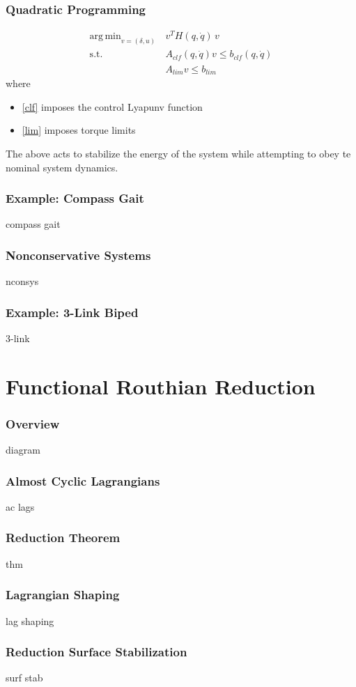 \documentclass{beamer}
\DeclareMathOperator*{\argmin}{arg\,min}
\begin{document}
\begin{frame}
  \frametitle{Quadratic Programming}
  \begin{align}
    \nonumber
    \argmin_{v = (\delta, u)}  \, &v^T \! H(q, \dot q) \, v\\
    \label{clf} \tag{clf}
    \mbox{s.t. } & A_{\mathit{clf}}(q, \dot q) v \leq b_{\mathit{clf}}(q, \dot q)\\
    \label{lim} \tag{lim}
    & A_{\mathit{lim}} v \leq b_{\mathit{lim}}
  \end{align}
  where
  \begin{itemize}
  \item\eqref{clf} imposes the control Lyapunv function
  \item\eqref{lim} imposes torque limits
  \end{itemize}
  The above acts to stabilize the energy of the system while attempting to obey te nominal system dynamics.
\end{frame}

\begin{frame}
  \frametitle{Example: Compass Gait}
  compass gait
\end{frame}

\begin{frame}
  \frametitle{Nonconservative Systems}
  nconsys
\end{frame}

\begin{frame}
  \frametitle{Example: 3-Link Biped}
  3-link
\end{frame}

\section{Functional Routhian Reduction}
\begin{frame}
  \frametitle{Overview}
  diagram
\end{frame}

\begin{frame}
  \frametitle{Almost Cyclic Lagrangians}
  ac lags
\end{frame}

\begin{frame}
  \frametitle{Reduction Theorem}
  thm
\end{frame}

\begin{frame}
  \frametitle{Lagrangian Shaping}
  lag shaping
\end{frame}

\begin{frame}
  \frametitle{Reduction Surface Stabilization}
  surf stab
\end{frame}
\end{document}
